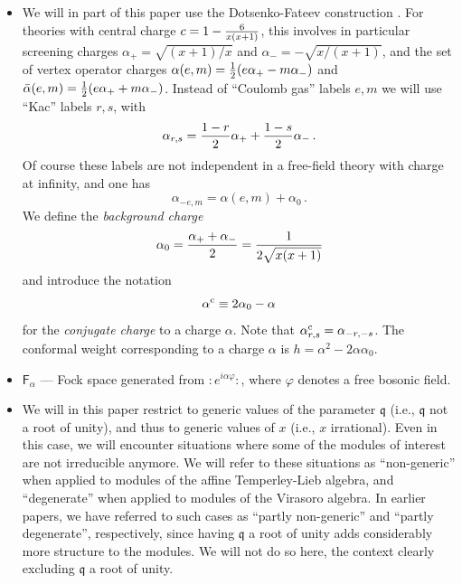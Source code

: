 \documentclass[a4paper,10pt]{article}
\newcommand{\q}{\mathfrak{q}}
\newcommand{\FV}[1]{\mathsf{F}_{#1}} %
\newcommand{\normord}[1]{\boldsymbol{:}\mathrel{#1}\boldsymbol{:}}
\begin{document}
\begin{itemize}
\item{} We will in part of this paper use the Dotsenko-Fateev construction \cite{DotsenkoFateev}. For theories with central charge $c=1-{6\over x(x+1)}$, this involves in particular screening charges $\alpha_+=\sqrt{(x+1) /  x}$ and $\alpha_-=-\sqrt{x / (x+1)}$, and the set of vertex operator charges 
$\alpha(e,m)={1\over 2}(e\alpha_+-m\alpha_-)$ and $\bar{\alpha}(e,m)={1\over 2}(e\alpha_++m\alpha_-)$. Instead of ``Coulomb gas'' labels $e,m$ we will use ``Kac'' labels $r,s$, with 
\begin{equation}\label{alpha_rs}
\alpha_{r,s}={1-r\over 2}\alpha_++{1-s\over 2}\alpha_-\,.
\end{equation}
Of course these labels are not independent in a free-field theory with charge at infinity, and one has 
%
\begin{equation}
\alpha_{-e,m}=\alpha(e,m)+\alpha_0 \,.
\end{equation}
%
We define the {\em background charge}
\begin{equation} \label{alphazero}
 \alpha_0 = \frac{\alpha_+ + \alpha_-}{2} = {1\over 2\sqrt{x(x+1)}}
\end{equation}
%
and introduce the notation
%
\begin{equation}\label{conjugate_charge}
 \alpha^{\rm c} \equiv  2\alpha_0-\alpha
\end{equation}
%
for the {\em conjugate charge} to a charge $\alpha$. Note that $\alpha_{r,s}^{\rm c}=\alpha_{-r,-s}$. The conformal weight corresponding to a charge $\alpha$ is $ h = \alpha^2-2\alpha\alpha_0 $.

\item{} $\FV{\alpha}$ --- Fock space generated from $\normord{e^{i\alpha\varphi}}$, where $\varphi$ denotes a free bosonic field.


\item{} We will in this paper restrict to generic values of the parameter $\q$ (i.e., $\q$ not a root of unity), and thus to generic values of $x$ (i.e., $x$ irrational). Even in this case, we will encounter situations where some of the modules of interest are not irreducible anymore. We will refer to these situations as ``non-generic'' when applied to modules of the affine Temperley-Lieb algebra, and ``degenerate'' when applied to modules of the Virasoro algebra. In earlier papers, we have referred to such cases as ``partly non-generic'' and ``partly degenerate'', respectively, since having $\q$ a root of unity adds considerably more structure to the modules. We will not do so here, the context clearly excluding $\q$ a root of unity. 


\end{itemize}
\end{document}
